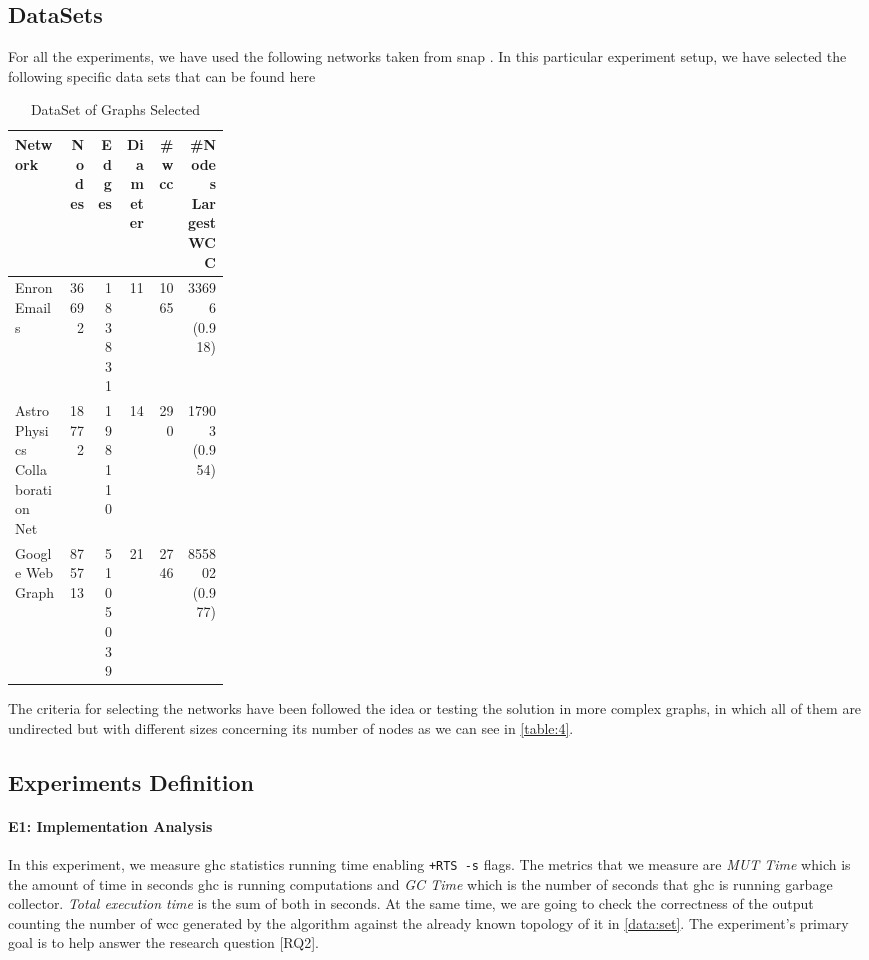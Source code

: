 \documentclass[preprint]{elsarticle}
\begin{document}
\subsection{DataSets}\label{data:set}

For all the experiments, we have used the following networks taken from \acrshort{snap} \cite{stanford}. In this particular experiment setup, we have selected the following specific data sets that can be found here \cite{netenron, netastro, netwebgoogle}

\begin{table}[H]
  \centering
  \begin{tabular}{|p{0.25\linewidth}|r|r|r|r|r|}
   \hline
   \textbf{Network} & \textbf{Nodes} & \textbf{Edges} & \textbf{Diameter} & \textbf{\#\acrshort{wcc}} & \textbf{\#Nodes Largest WCC} \\
   \hline
   Enron Emails & 36692 & 183831 & 11 & 1065 & 33696 (0.918) \\
   \hline
   Astro Physics Collaboration Net & 18772 & 198110 & 14 & 290 & 17903 (0.954)\\
   \hline
   Google Web Graph & 875713 & 5105039 & 21 & 2746 & 855802 (0.977)\\
   \hline
  \end{tabular}
 \caption{DataSet of Graphs Selected}
 \label{table:4}
 \end{table}
 
 The criteria for selecting the networks have been followed the idea or testing the solution in more complex graphs, in which all of them are undirected but with different sizes concerning its number of nodes as we can see in  \autoref{table:4}. 

\subsection{Experiments Definition}\label{sub:exp:def}
\paragraph{E1: Implementation Analysis}
In this experiment, we measure \acrshort{ghc} statistics running time enabling \texttt{+RTS -s} flags. The metrics that we measure are \emph{MUT Time} which is the amount of time in seconds \acrshort{ghc} is running computations and \emph{GC Time} which is the number of seconds that \acrshort{ghc} is running garbage collector. \emph{Total execution time} is the sum of both in seconds. At the same time, we are going to check the correctness of the output counting the number of \acrshort{wcc} generated by the algorithm against the already known topology of it in \autoref{data:set}. The experiment's primary goal is to help answer the research question [RQ2].
\end{document}
